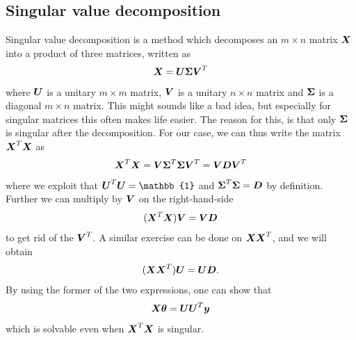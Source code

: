 \subsection{Singular value decomposition}
Singular value decomposition is a method which decomposes an $m\times n$ matrix $\boldsymbol{{X}}$ into a product of three matrices, written as
\begin{equation}
\boldsymbol{{X}}=\boldsymbol{{U}}\boldsymbol{{\Sigma}}\boldsymbol{{V}}^T
\end{equation}
where $\boldsymbol{{U}}$ is a unitary $m\times m$ matrix, $\boldsymbol{{V}}$ is a unitary $n\times n$ matrix and $\boldsymbol{{\Sigma}}$ is a diagonal $m\times n$ matrix. This might sounds like a bad idea, but especially for singular matrices this often makes life easier. The reason for this, is that only $\boldsymbol{{\Sigma}}$ is singular after the decomposition. For our case, we can thus write the matrix $\boldsymbol{{X}}^T\boldsymbol{{X}}$ as 
\begin{equation}
\boldsymbol{{X}}^T\boldsymbol{{X}}=\boldsymbol{{V}}\boldsymbol{{\Sigma}}^T\boldsymbol{{\Sigma}}\boldsymbol{{V}}^T=\boldsymbol{{V}}\boldsymbol{{D}}\boldsymbol{{V}}^T
\end{equation}
where we exploit that $\bs{U}^T\bs{U}=\mathbb{1}$ and $\boldsymbol{{\Sigma}}^T\boldsymbol{{\Sigma}}=\boldsymbol{{D}}$ by definition. Further we can multiply by $\boldsymbol{{V}}$ on the right-hand-side
\begin{equation}
(\boldsymbol{{X}}^T\boldsymbol{{X}})\boldsymbol{{V}}=\boldsymbol{{V}}\boldsymbol{{D}}
\end{equation}
to get rid of the $\boldsymbol{{V}}^T$. A similar exercise can be done on $\boldsymbol{{X}}\boldsymbol{{X}}^T$, and we will obtain
\begin{equation}
(\boldsymbol{{X}}\boldsymbol{{X}}^T)\boldsymbol{{U}}=\boldsymbol{{U}}\boldsymbol{{D}}.
\end{equation}
By using the former of the two expressions, one can show that
\begin{equation}
\boldsymbol{{X}}\boldsymbol{{\theta}}=\boldsymbol{{U}}\boldsymbol{{U}}^T\boldsymbol{{y}}
\end{equation}
which is solvable even when $\boldsymbol{{X}}^T\boldsymbol{{X}}$ is singular.


